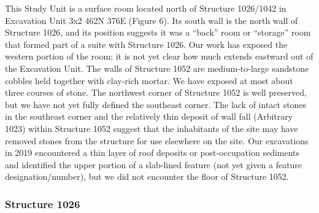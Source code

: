 \documentclass[
  12pt,
]{krantz}
\begin{document}
This Study Unit is a surface room located north of Structure 1026/1042
in Excavation Unit 3x2 462N 376E (Figure 6). Its south wall is the north
wall of Structure 1026, and its position suggests it was a ``back'' room
or ``storage'' room that formed part of a suite with Structure 1026. Our
work has exposed the western portion of the room; it is not yet clear
how much extends eastward out of the Excavation Unit. The walls of
Structure 1052 are medium-to-large sandstone cobbles held together with
clay-rich mortar. We have exposed at most about three courses of stone.
The northwest corner of Structure 1052 is well preserved, but we have
not yet fully defined the southeast corner. The lack of intact stones in
the southeast corner and the relatively thin deposit of wall fall
(Arbitrary 1023) within Structure 1052 suggest that the inhabitants of
the site may have removed stones from the structure for use elsewhere on
the site. Our excavations in 2019 encountered a thin layer of roof
deposits or post-occupation sediments and identified the upper portion
of a slab-lined feature (not yet given a feature designation/number),
but we did not encounter the floor of Structure 1052.

\hypertarget{structure-1026}{%
\subsubsection{Structure 1026}\label{structure-1026}}
\end{document}
